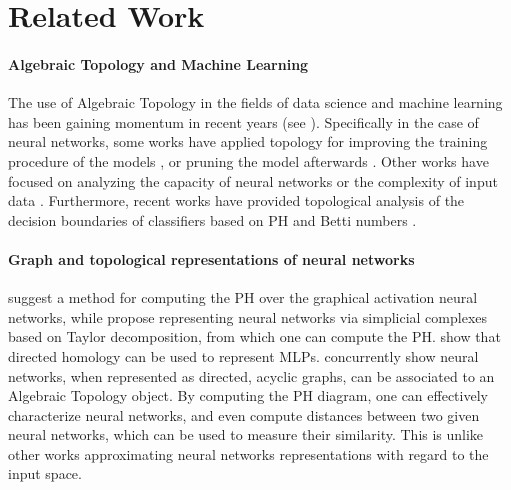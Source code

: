 \documentclass{article}
\begin{document}
\section{Related Work}
\label{sec:related}

\paragraph{Algebraic Topology and Machine Learning}
The use of Algebraic Topology in the fields of data science and machine learning has been gaining momentum in recent years (see \citet{Carlsson2009TopologyAD}). Specifically in the case of neural networks, some works have applied topology for improving the training procedure of the models \cite{Hofer2020TopologicallyDD, Clough2020ATL}, or pruning the model afterwards \cite{watanabe2020deep}. Other works have focused on analyzing the capacity of neural networks  \cite{Guss2018OnCT, Rieck2019NeuralPA, Konuk2019AnES} or the complexity of input data \cite{Konuk2019AnES}. Furthermore, recent works have provided topological analysis of the decision boundaries of classifiers based on PH and Betti numbers \cite{Ramamurthy2019TopologicalDA, Naitzat2020TopologyOD}.

\paragraph{Graph and topological representations of neural networks} \citet{Gebhart2019CharacterizingTS} suggest a method for computing the PH over the graphical activation neural networks, while \citet{Watanabe2020TopologicalMO} propose representing neural networks via simplicial complexes based on Taylor decomposition, from which one can compute the PH. \citet{Chowdhury2019PathHO} show that directed homology can be used to represent MLPs. \citet{anonymous} concurrently show neural networks, when represented as directed, acyclic graphs, can be associated to an Algebraic Topology object. By computing the PH diagram, one can effectively characterize neural networks, and even compute distances between two given neural networks, which can be used to measure their similarity. This is unlike other works \cite{8953424, DBLP:journals/corr/abs-1802-04443} approximating neural networks representations with regard to the input space.
\end{document}
